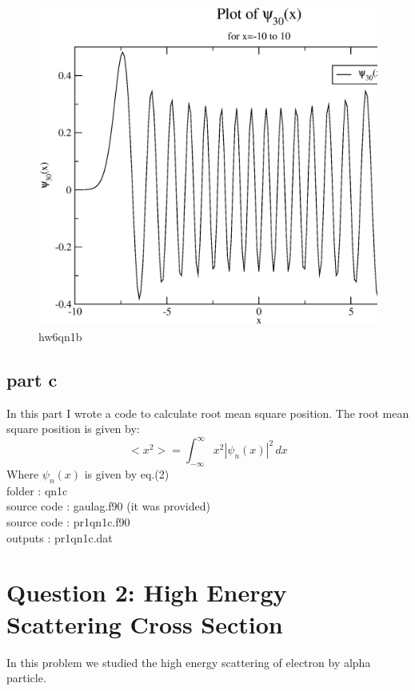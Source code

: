 \documentclass[11pt,a4paper,english]{article}
\newcommand{\beq}{\begin{equation}}
\newcommand{\eeq}{\end{equation}}
\begin{document}
	\begin{figure}[h!]
	\centering
	\includegraphics [scale=0.6]{pr1qn1b.eps}
	\caption{hw6qn1b }
	\end{figure}
	\clearpage
	

	
	\subsection{part c}
In this part I wrote a code to calculate root mean square position. The root mean square position is given by:\\
\beq
<x^{2}> = \int_{-\infty}^{\infty} \!\! x^{2} |\psi_{n}(x)|^{2}  \,dx 
\eeq
Where $\psi_{n}(x)$ is given by eq.(2)\\

    folder       : qn1c\\
	source code  : gaulag.f90 (it was provided)\\
	source code  : pr1qn1c.f90\\
	outputs      : pr1qn1c.dat\\

\clearpage	
\section{Question 2: High Energy Scattering Cross Section}
In this problem we studied the high energy scattering of electron by alpha particle.
\end{document}

